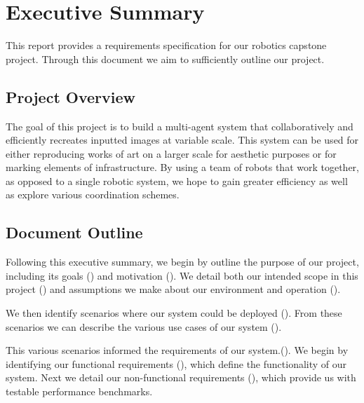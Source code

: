 
\section {Executive Summary}
\label{sec:executive_summary}
This report provides a requirements specification for our robotics capstone project. Through this document we aim to sufficiently outline our project. 

\subsection{Project Overview}
The goal of this project is to build a multi-agent system that collaboratively and efficiently recreates inputted images at variable scale. 
This system can be used for either reproducing works of art on a larger scale for aesthetic purposes or for marking elements of infrastructure. 
By using a team of robots that work together, as opposed to a single robotic system, we hope to gain greater efficiency as well as explore various coordination schemes. 


\subsection{Document Outline}
Following this executive summary, we begin by outline the purpose of our project, including its goals () and motivation (). 
We detail both our intended scope in this project () and assumptions we make about our environment and operation (). 

We then identify scenarios where our system could be deployed (). 
From these scenarios we can describe the various use cases of our system ().

This various scenarios informed the requirements of our system.(). 
We begin by identifying our functional requirements (), which define the functionality of our system. 
Next we detail our non-functional requirements (), which provide us with testable performance benchmarks.

